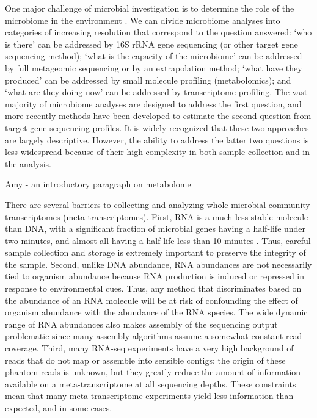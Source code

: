 \documentclass[10pt,letterpaper]{article}
\begin{document}
One major challenge of microbial investigation is to determine the  role of the microbiome in the environment	. We can divide microbiome analyses into categories of increasing resolution that correspond to the question answered: `who is there' can be addressed by 16S rRNA gene sequencing (or other target gene sequencing method); `what is the capacity of the microbiome' can be addressed by full metageomic sequencing or by an extrapolation method;  `what have they produced' can be addressed by small molecule profiling (metabolomics); and `what are they doing now' can be addressed by transcriptome profiling. The vast majority of microbiome analyses are designed to address the first question, and more recently methods have been developed to estimate the second question from target gene sequencing profiles. It is widely recognized that these two approaches are largely descriptive. However, the ability to address the latter two questions is less widespread because of their high complexity in both sample collection and in the analysis.  

Amy - an introductory paragraph on metabolome

There are several barriers to collecting and analyzing whole microbial community transcriptomes (meta-transcriptomes). First, RNA is a much less stable molecule than DNA, with a significant fraction of microbial genes having a half-life under two minutes, and almost all having a half-life less than 10 minutes \cite{mRNA:2002, mRNA:2006}. Thus, careful sample collection and storage is extremely important to preserve the integrity of the sample. Second, unlike DNA abundance, RNA abundances are not necessarily tied to organism abundance because RNA production is induced or repressed in response to environmental cues. Thus, any method that discriminates based on the abundance of an RNA molecule will be at risk of confounding the effect of organism abundance with the abundance of the RNA species. The wide dynamic range of RNA abundances also makes assembly of the sequencing output problematic since many assembly algorithms assume a somewhat constant read coverage. Third, many RNA-seq experiments have a very high background of reads that do not map or assemble into sensible contigs: the origin of these phantom reads is unknown, but they greatly reduce the amount of information available on a meta-transcriptome at all sequencing depths. These constraints mean that many meta-transcriptome experiments yield less information than expected, and in some cases. 
\end{document}
